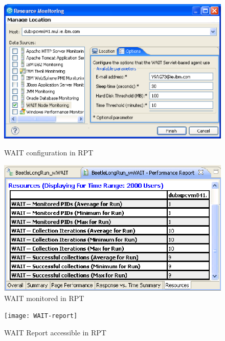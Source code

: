 \documentclass[runningheads,a4paper]{llncs}
\begin{document}
\vspace{-5pt}
\begin{figure}
\centering
\begin{minipage}[b]{.50\textwidth}

\centering
\includegraphics[totalheight=.27\textheight,width=1.0\textwidth]{WAIT-config}
\caption{WAIT configuration in RPT}
\label{fig_config}

\end{minipage}\qquad
\begin{minipage}[b]{.44\textwidth}

\centering
\includegraphics[totalheight=.27\textheight,width=1.0\textwidth]{WAIT-monitoring}
\caption{WAIT monitored in RPT}
\label{fig_mon}

\end{minipage}
\end{figure}
\vspace{-5pt}

\begin{figure}[!h]
\centering
\texttt{[image: WAIT-report]}
\caption{WAIT Report accessible in RPT}
\label{fig_report}
\end{figure}
\end{document}
